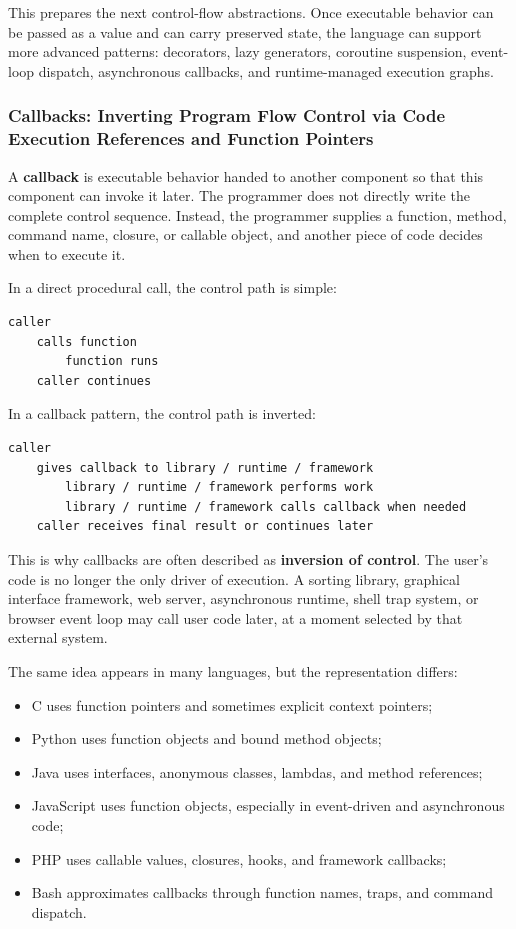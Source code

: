 \documentclass[a4paper,twoside]{report}
\begin{document}
This prepares the next control-flow abstractions. Once executable behavior can be passed as a value and can carry preserved state, the language can support more advanced patterns: decorators, lazy generators, coroutine suspension, event-loop dispatch, asynchronous callbacks, and runtime-managed execution graphs.





\subsubsection{Callbacks: Inverting Program Flow Control via Code Execution References and Function Pointers}

A \textbf{callback} is executable behavior handed to another component so that this component can invoke it later. The programmer does not directly write the complete control sequence. Instead, the programmer supplies a function, method, command name, closure, or callable object, and another piece of code decides when to execute it.

In a direct procedural call, the control path is simple:

\begin{verbatim}
caller
    calls function
        function runs
    caller continues
\end{verbatim}

In a callback pattern, the control path is inverted:

\begin{verbatim}
caller
    gives callback to library / runtime / framework
        library / runtime / framework performs work
        library / runtime / framework calls callback when needed
    caller receives final result or continues later
\end{verbatim}

This is why callbacks are often described as \textbf{inversion of control}. The user's code is no longer the only driver of execution. A sorting library, graphical interface framework, web server, asynchronous runtime, shell trap system, or browser event loop may call user code later, at a moment selected by that external system.

The same idea appears in many languages, but the representation differs:

\begin{itemize}
    \item C uses function pointers and sometimes explicit context pointers;
    \item Python uses function objects and bound method objects;
    \item Java uses interfaces, anonymous classes, lambdas, and method references;
    \item JavaScript uses function objects, especially in event-driven and asynchronous code;
    \item PHP uses callable values, closures, hooks, and framework callbacks;
    \item Bash approximates callbacks through function names, traps, and command dispatch.
\end{itemize}
\end{document}
